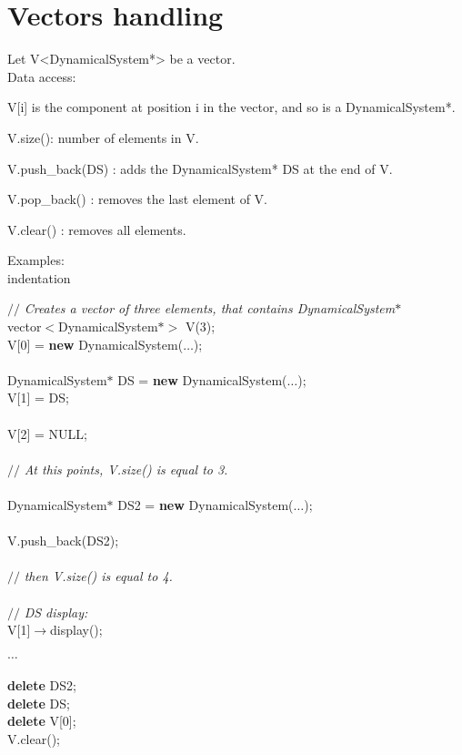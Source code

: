 \documentclass[10pt]{article}
\begin{document}
\section{Vectors handling}

Let V<DynamicalSystem*> be a vector. \\

Data access: 
\bei
\item V[i] is the component at position i in the vector, and so is a DynamicalSystem*. 
\item V.size(): number of elements in V. 
\item V.push\_back(DS) : adds the DynamicalSystem* DS at the end of V. 
\item V.pop\_back() : removes the last element of V. 
\item V.clear() : removes all elements. 
\ei

Examples: \\
\expandafter\ifx\csname indentation\endcsname\relax%
\newlength{\indentation}\fi
\setlength{\indentation}{0.5em}
\begin{flushleft}
{$//$\it{} Creates a vector of three elements, that contains DynamicalSystem$\ast${}\mbox{}\\
}vector$<$DynamicalSystem$\ast$$>$ V(3);\mbox{}\\
V[0] = {\bf new} DynamicalSystem($\ldots$);\mbox{}\\
\mbox{}\\
DynamicalSystem$\ast$ DS = {\bf new} DynamicalSystem($\ldots$);\mbox{}\\
V[1] = DS;\mbox{}\\
\mbox{}\\
V[2] = NULL; \mbox{}\\
\mbox{}\\
{$//$\it{} At this points, V.size() is equal to 3.{}\mbox{}\\
}\mbox{}\\
DynamicalSystem$\ast$ DS2 = {\bf new} DynamicalSystem($\ldots$);\mbox{}\\
\mbox{}\\
V.push\_back(DS2);\mbox{}\\
\mbox{}\\
{$//$\it{} then V.size() is equal to 4.{}\mbox{}\\
}\mbox{}\\
{$//$\it{} DS display: {}\mbox{}\\
}V[1]$\rightarrow$display();\mbox{}\\
\mbox{}\\
$\ldots$\mbox{}\\
\mbox{}\\
{\bf delete} DS2;\mbox{}\\
{\bf delete} DS;\mbox{}\\
{\bf delete} V[0];\mbox{}\\
V.clear();\mbox{}\\
\end{flushleft}
\end{document}
